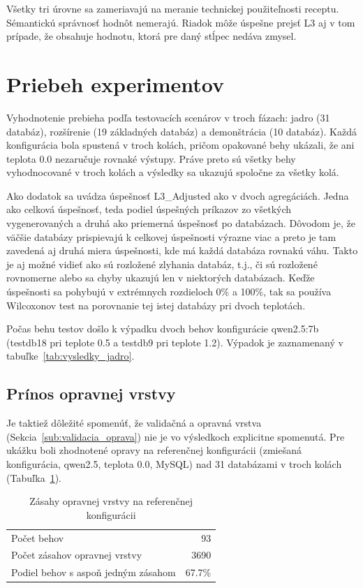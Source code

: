 Všetky tri úrovne sa zameriavajú na meranie technickej použiteľnosti receptu. Sémantickú správnosť  hodnôt nemerajú. Riadok môže úspešne prejsť L3 aj v tom prípade, že obsahuje hodnotu, ktorá pre daný stĺpec nedáva zmysel.


\section{Priebeh experimentov}
Vyhodnotenie prebieha podľa testovacích scenárov v troch fázach: jadro (31 databáz), rozšírenie (19 základných databáz) a demonštrácia (10 databáz). Každá konfigurácia bola spustená v troch kolách, pričom opakované behy ukázali, že ani teplota 0.0 nezaručuje rovnaké výstupy. Práve preto sú všetky behy vyhodnocované v troch kolách a výsledky sa ukazujú spoločne za všetky kolá.


Ako dodatok sa uvádza úspešnosť L3\_Adjusted ako v dvoch agregáciách. Jedna ako celková úspešnosť, teda podiel úspešných príkazov zo všetkých vygenerovaných a druhá ako priemerná úspešnosť po databázach. Dôvodom je, že väčšie databázy prispievajú k celkovej úspešnosti výrazne viac a preto je tam zavedená aj druhá miera úspešnosti, kde má každá databáza rovnakú váhu. Takto je aj možné vidieť ako sú rozložené zlyhania databáz, t.j., či sú rozložené rovnomerne alebo sa chyby ukazujú len v niektorých databázach. Keďže úspešnosti sa pohybujú v extrémnych rozdieloch 0\% a 100\%, tak sa používa Wilcoxonov test na porovnanie tej istej databázy pri dvoch teplotách.


Počas behu testov došlo k výpadku dvoch behov konfigurácie qwen2.5:7b (testdb18 pri teplote 0.5 a testdb9 pri teplote 1.2). Výpadok je zaznamenaný v tabuľke~\ref{tab:vysledky_jadro}.

\subsection{Prínos opravnej vrstvy}
Je taktiež dôležité spomenúť, že validačná a opravná vrstva (Sekcia~\ref{sub:validacia_oprava}) nie je vo výsledkoch explicitne spomenutá. Pre ukážku boli zhodnotené opravy na referenčnej konfigurácii (zmiešaná konfigurácia, qwen2.5, teplota 0.0, MySQL) nad 31 databázami v troch kolách (Tabuľka~\ref{tab:opravy}).


\begin{table}[H]
    \centering
    \begin{tabular}{l r}
    \toprule
       Počet behov  & 93 \\
       Počet zásahov opravnej vrstvy & 3690 \\
       Podiel behov s aspoň jedným zásahom  & 67.7\% \\
    \bottomrule
    \end{tabular}
    \caption{Zásahy opravnej vrstvy na referenčnej konfigurácii}
    \label{tab:opravy}
\end{table}

